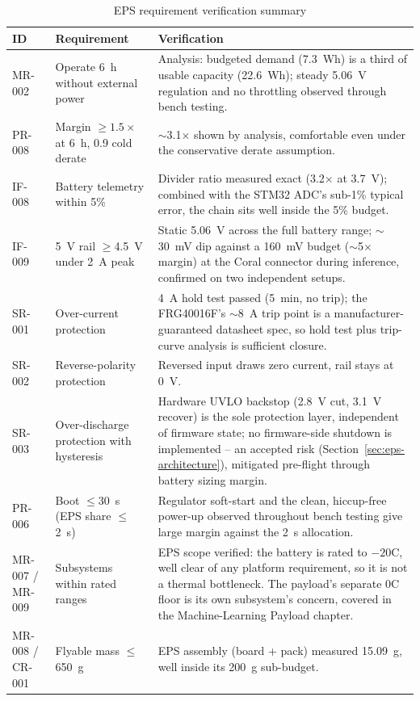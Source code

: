 \begin{table}[H]
\centering
\small
\begin{tabular}{p{2.1cm}p{3.3cm}p{8.0cm}}
\toprule
\textbf{ID} & \textbf{Requirement} & \textbf{Verification} \\
\midrule
MR-002 & Operate 6~h without external power & Analysis: budgeted demand
(7.3~Wh) is a third of usable capacity (22.6~Wh); steady 5.06~V regulation
and no throttling observed through bench testing. \\
PR-008 & Margin $\geq 1.5\times$ at 6~h, 0.9 cold derate & $\sim$3.1$\times$
shown by analysis, comfortable even under the conservative derate
assumption. \\
IF-008 & Battery telemetry within 5\% & Divider ratio measured exact
(3.2$\times$ at 3.7~V); combined with the STM32 ADC's sub-1\% typical
error, the chain sits well inside the 5\% budget. \\
IF-009 & 5~V rail $\geq$4.5~V under 2~A peak & Static 5.06~V across the full
battery range; $\sim$30~mV dip against a 160~mV budget ($\sim$5$\times$
margin) at the Coral connector during inference, confirmed on two
independent setups. \\
SR-001 & Over-current protection & 4~A hold test passed (5~min, no trip);
the FRG40016F's $\sim$8~A trip point is a manufacturer-guaranteed datasheet
spec, so hold test plus trip-curve analysis is sufficient closure. \\
SR-002 & Reverse-polarity protection & Reversed input draws zero current,
rail stays at 0~V. \\
SR-003 & Over-discharge protection with hysteresis & Hardware UVLO backstop
(2.8~V cut, 3.1~V recover) is the sole protection layer, independent of
firmware state; no firmware-side shutdown is implemented -- an accepted
risk (Section~\ref{sec:eps-architecture}), mitigated pre-flight through
battery sizing margin. \\
PR-006 & Boot $\leq$30~s (EPS share $\leq$2~s) & Regulator soft-start and
the clean, hiccup-free power-up observed throughout bench testing give
large margin against the 2~s allocation. \\
MR-007 / MR-009 & Subsystems within rated ranges & EPS scope verified: the
battery is rated to $-20$\textdegree{}C, well clear of any platform
requirement, so it is not a thermal bottleneck. The payload's separate
0\textdegree{}C floor is its own subsystem's concern, covered in the
Machine-Learning Payload chapter. \\
MR-008 / CR-001 & Flyable mass $\leq$650~g & EPS assembly (board + pack)
measured 15.09~g, well inside its 200~g sub-budget. \\
\bottomrule
\end{tabular}
\caption{EPS requirement verification summary}
\end{table}
